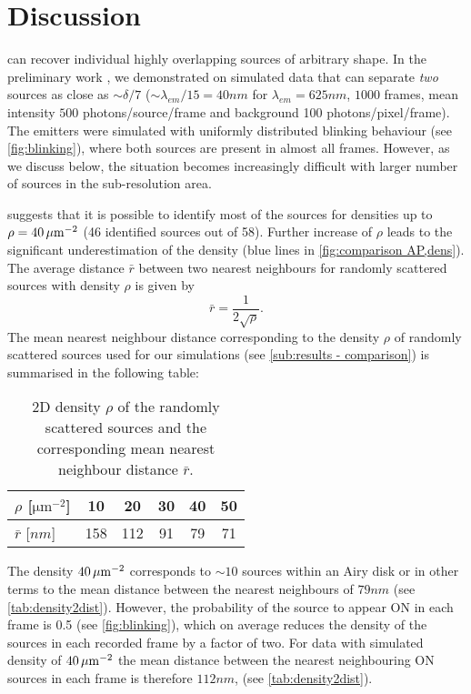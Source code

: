 
\clearpage
\section{Discussion\label{sec:Discussion}}

\inmf{} can recover individual highly overlapping sources of arbitrary shape. In the preliminary work \cite{Mandula2010b}, we demonstrated on simulated data that \inmf{} can separate \emph{two} sources as close as $\sim \delta/7$ ($\sim \lambda_{em}/15 = 40 \unit{nm}$ for $\lambda_{em}=625 \unit{nm}$, $1000$ frames, mean intensity $500$ photons/source/frame and background 100 photons/pixel/frame). The emitters were simulated with uniformly distributed blinking behaviour (see \autoref{fig:blinking}\aaa), where both sources are present in almost all frames. However, as we discuss below, the situation becomes increasingly difficult with larger number of sources in the sub-resolution area.

 suggests that it is possible to identify most of the sources for densities up to $\rho=40\, \mathrm{\mu m}^{-2}$ (46 identified sources out of 58). Further increase of $\rho$ leads to the significant underestimation of the density (blue lines in \autoref{fig:comparison AP,dens}\aaa). The average distance $\bar{r}$ between two nearest neighbours for randomly scattered sources with density $\rho$ is given by \cite{Frieden1991}
%
\begin{equation}
	\bar{r}=\frac{1}{2\sqrt{\rho}}.
\end{equation}
%
The mean nearest neighbour distance corresponding to the density $\rho$ of randomly scattered sources used for our simulations (see \autoref{sub:results - comparison}) is summarised in the following table:
%
\begin{table}[!h]
	\centering
	\begin{tabular}{l|ccccc}
		$\rho$ [$\unit{\um^{-2}}$]		& 10		& 20		& 30		& 40		& 50\\ \hline
		$\bar{r}$ [$\unit{nm}$]		& 158	& 112	& 91		& 79		& 71
	\end{tabular}
	\caption{2D density $\rho$ of the randomly scattered sources and the corresponding mean nearest neighbour distance $\bar{r}$.\label{tab:density2dist}}
\end{table}

The density $40\, \mathrm{\mu m}^{-2}$ corresponds to $\sim 10$ sources within an Airy disk or in other terms to the mean distance between the nearest neighbours of $79\unit{nm}$ (see \autoref{tab:density2dist}). However, the probability of the source to appear ON in each frame is 0.5 (see \autoref{fig:blinking}\ddd), which on average reduces the density of the sources in each recorded frame by a factor of two. For data with simulated density of $40\, \mathrm{\mu m}^{-2}$ the mean distance between the nearest neighbouring ON sources in each frame is therefore $112 \unit{nm}$, (see \autoref{tab:density2dist}).  

